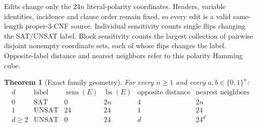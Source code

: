 \documentclass[11pt]{article}
\newtheorem{theorem}{Theorem}
\newcommand{\sens}{\operatorname{sens}}
\newcommand{\bs}{\operatorname{bs}}
\begin{document}
Edits change only the \(24n\) literal-polarity coordinates. Headers, variable identities, incidence and clause order remain fixed, so every edit is a valid same-length proper-3-CNF source. Individual sensitivity counts single flips changing the SAT/UNSAT label. Block sensitivity counts the largest collection of pairwise disjoint nonempty coordinate sets, each of whose flips changes the label. Opposite-label distance and nearest neighbors refer to this polarity Hamming cube.

\begin{theorem}[Exact family geometry]\label{thm:geometry}
For every \(n\ge1\) and every \(a,b\in\{0,1\}^n\):
\[
\begin{array}{c|c|c|c|c|c}
d&\text{label}&\sens(E)&\bs(E)&\text{opposite distance}&\text{nearest neighbors}\\\hline
0&\mathrm{SAT}&0&2n&4&2n\\
1&\mathrm{UNSAT}&24&24&1&24\\
d\ge2&\mathrm{UNSAT}&0&24&d&24^d
\end{array}
\]
\end{theorem}
\end{document}
